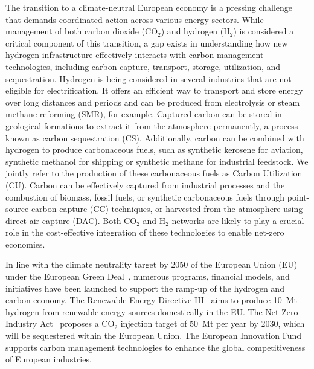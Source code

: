 \documentclass[twocolumn]{article}
\newcommand{\carbon}{CO$_2$}
\newcommand{\hydrogen}{H$_2$}
\begin{document}
The transition to a climate-neutral European economy is a pressing challenge that demands coordinated action across various energy sectors. While management of both carbon dioxide (\carbon{}) and hydrogen (\hydrogen{}) is considered a critical component of this transition, a gap exists in understanding how new hydrogen infrastructure effectively interacts with carbon management technologies, including carbon capture, transport, storage, utilization, and sequestration. Hydrogen is being considered in several industries that are not eligible for electrification. It offers an efficient way to transport and store energy over long distances and periods and can be produced from electrolysis or steam methane reforming (SMR), for example. Captured carbon can be stored in geological formations to extract it from the atmosphere permanently, a process known as carbon sequestration (CS). Additionally, carbon can be combined with hydrogen to produce carbonaceous fuels, such as synthetic kerosene for aviation, synthetic methanol for shipping or synthetic methane for industrial feedstock. We jointly refer to the production of these carbonaceous fuels as Carbon Utilization (CU). Carbon can be effectively captured from industrial processes and the combustion of biomass, fossil fuels, or synthetic carbonaceous fuels through point-source carbon capture (CC) techniques, or harvested from the atmosphere using direct air capture (DAC). Both \carbon{} and \hydrogen{} networks are likely to play a crucial role in the cost-effective integration of these technologies to enable net-zero economies.

In line with the climate neutrality target by 2050 of the European Union (EU) under the European Green Deal~\cite{europeangreendeal}, numerous programs, financial models, and initiatives have been launched to support the ramp-up of the hydrogen and carbon economy. The Renewable Energy Directive III~\cite{DirectiveEU20232023} aims to produce 10~Mt hydrogen from renewable energy sources domestically in the EU. The Net-Zero Industry Act~\cite{eu2023netzero} proposes a \carbon{} injection target of 50~Mt per year by 2030, which will be sequestered within the European Union. The European Innovation Fund~\cite{europeaninnovationfund} supports carbon management technologies to enhance the global competitiveness of European industries.
\end{document}
